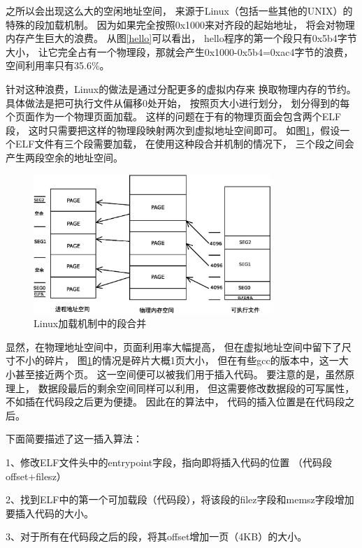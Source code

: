 之所以会出现这么大的空闲地址空间，
来源于Linux（包括一些其他的UNIX）的特殊的段加载机制。
因为如果完全按照0x1000来对齐段的起始地址，
将会对物理内存产生巨大的浪费。
从图\ref{hello}可以看出，
hello程序的第一个段只有0x5b4字节大小，
让它完全占有一个物理段，那就会产生0x1000-0x5b4=0xac4字节的浪费，
空间利用率只有35.6\%。


针对这种浪费，Linux的做法是通过分配更多的虚拟内存来
换取物理内存的节约。
具体做法是把可执行文件从偏移0处开始，
按照页大小进行划分，
划分得到的每个页面作为一个物理页面加载。
这样的问题在于有的物理页面会包含两个ELF段，
这时只需要把这样的物理段映射两次到虚拟地址空间即可。
如图\ref{linuxmap}，假设一个ELF文件有三个段需要加载，
在使用这种段合并机制的情况下，
三个段之间会产生两段空余的地址空间。


\begin{figure}[h!]
  \centering
  \includegraphics[width=0.8\textwidth]{figure/linuxmap.eps}
  \caption{Linux加载机制中的段合并}
  \label{linuxmap}
\end{figure}



显然，在物理地址空间中，页面利用率大幅提高，
但在虚拟地址空间中留下了尺寸不小的碎片，
图\ref{linuxmap}的情况是碎片大概1页大小，
但在有些gcc的版本中，这一大小甚至接近两个页。
这一空间便可以被我们用于插入代码。
要注意的是，虽然原理上，
数据段最后的剩余空间同样可以利用，
但这需要修改数据段的可写属性，
不如插在代码段之后更为便捷。
因此在\cite{silvio}的算法中，
代码的插入位置是在代码段之后。

下面简要描述了这一插入算法：

1、修改ELF文件头中的entrypoint字段，指向即将插入代码的位置
（代码段offset+filesz）

2、找到ELF中的第一个可加载段（代码段），将该段的filez字段和memsz字段增加
要插入代码的大小。

3、对于所有在代码段之后的段，将其offset增加一页（4KB）的大小。

